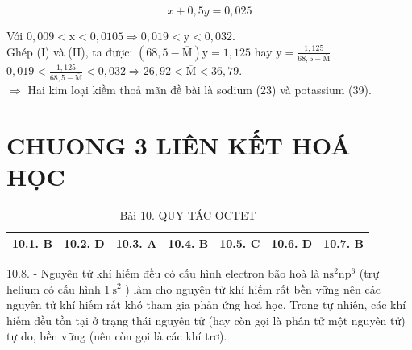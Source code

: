 \documentclass[10pt]{article}
\begin{document}
\begin{equation*}
x+0,5 y=0,025 \tag{I}
\end{equation*}


Với $0,009<\mathrm{x}<0,0105 \Rightarrow 0,019<\mathrm{y}<0,032$.\\
Ghép (I) và (II), ta được: $(68,5-\overline{\mathrm{M}}) \mathrm{y}=1,125$ hay $\mathrm{y}=\frac{1,125}{68,5-\overline{\mathrm{M}}}$\\
$0,019<\frac{1,125}{68,5-\overline{\mathrm{M}}}<0,032 \Rightarrow 26,92<\overline{\mathrm{M}}<36,79$.\\
$\Rightarrow$ Hai kim loại kiềm thoả mãn đề bài là sodium (23) và potassium (39).

\section*{CHUONG 3 LIÊN KẾT HOÁ HỌC}
\begin{table}[h]
\begin{center}
\captionsetup{labelformat=empty}
\caption{Bài 10. QUY TÁC OCTET}
\begin{tabular}{|c|c|c|c|c|c|c|}
\hline
10.1. B & 10.2. D & 10.3. A & 10.4. B & 10.5. C & 10.6. D & 10.7. B \\
\hline
\end{tabular}
\end{center}
\end{table}

10.8. - Nguyên tử khí hiếm đều có cấu hình electron bão hoà là $\mathrm{ns}^{2} \mathrm{np}^{6}$ (trự helium có cấu hình $1 \mathrm{~s}^{2}$ ) làm cho nguyên tử khí hiếm rất bền vững nên các nguyên tử khí hiếm rất khó tham gia phản ứng hoá học. Trong tự nhiên, các khí hiếm đều tồn tại ở trạng thái nguyên tử (hay còn gọi là phân tử một nguyên tử) tự do, bền vững (nên còn gọi là các khí trơ).
\end{document}
